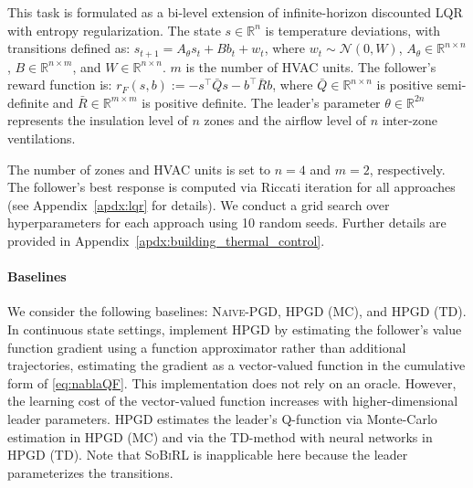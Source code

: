 \documentclass[letterpaper]{article} %
\providecommand{\R}{\mathbb{R}} %
\begin{document}
This task is formulated as a bi-level extension of infinite-horizon discounted LQR with entropy regularization. 
The state $s\in\R^n$ is temperature deviations, with transitions defined as:
$s_{t+1} = A_{\theta} s_{t} + B b_{t} + w_{t}$, where $w_t\sim \mathcal{N}(0,W)$,
$A_{\theta} \in \R^{n\times n}$, $B \in \R^{n \times m}$, and $W \in \R^{n \times n}$.
$m$ is the number of HVAC units.
The follower's reward function is: $r_F(s, b) := - s^{\top} \bar{Q} s - b^{\top} \bar{R} b$, where $\bar{Q} \in \R^{n\times n}$ is positive semi-definite and $\bar{R} \in \R^{m\times m}$ is positive definite.
The leader's parameter $\theta\in \R^{2n}$ represents the insulation level of $n$ zones and the airflow level of $n$ inter-zone ventilations.

The number of zones and HVAC units is set to $n=4$ and $m=2$, respectively.
The follower's best response is computed via Riccati iteration for all approaches (see Appendix~\ref{apdx:lqr} for details).
We conduct a grid search over hyperparameters for each approach using 10 random seeds.
Further details are provided in Appendix~\ref{apdx:building_thermal_control}.

\paragraph{Baselines}
We consider the following baselines: \textsc{Naive-PGD}, \textsc{HPGD (MC)}, and \textsc{HPGD (TD)}.
In continuous state settings, \citet{Thoma2024-em} implement \textsc{HPGD} by estimating the follower's value function gradient using a function approximator rather than additional trajectories, estimating the gradient as a vector-valued function in the cumulative form of \eqref{eq:nablaQF}.
This implementation does not rely on an oracle.
However, the learning cost of the vector-valued function increases with higher-dimensional leader parameters.
\textsc{HPGD} estimates the leader's Q-function via Monte-Carlo estimation in \textsc{HPGD (MC)} and via the TD-method with neural networks in \textsc{HPGD (TD)}.
Note that \textsc{SoBiRL} is inapplicable here because the leader parameterizes the transitions.
\end{document}
